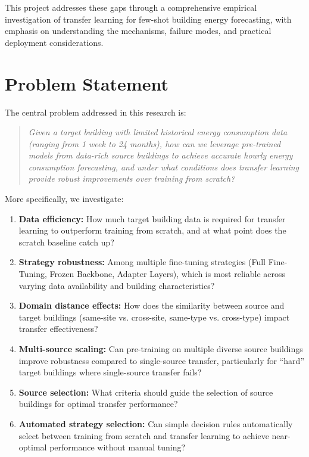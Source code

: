 \documentclass[12pt,a4paper]{report}
\begin{document}
This project addresses these gaps through a comprehensive empirical investigation of transfer learning for few-shot building energy forecasting, with emphasis on understanding the mechanisms, failure modes, and practical deployment considerations.

\section{Problem Statement}

The central problem addressed in this research is:

\begin{quote}
\textit{Given a target building with limited historical energy consumption data (ranging from 1 week to 24 months), how can we leverage pre-trained models from data-rich source buildings to achieve accurate hourly energy consumption forecasting, and under what conditions does transfer learning provide robust improvements over training from scratch?}
\end{quote}

More specifically, we investigate:

\begin{enumerate}
    \item \textbf{Data efficiency:} How much target building data is required for transfer learning to outperform training from scratch, and at what point does the scratch baseline catch up?
    
    \item \textbf{Strategy robustness:} Among multiple fine-tuning strategies (Full Fine-Tuning, Frozen Backbone, Adapter Layers), which is most reliable across varying data availability and building characteristics?
    
    \item \textbf{Domain distance effects:} How does the similarity between source and target buildings (same-site vs. cross-site, same-type vs. cross-type) impact transfer effectiveness?
    
    \item \textbf{Multi-source scaling:} Can pre-training on multiple diverse source buildings improve robustness compared to single-source transfer, particularly for ``hard'' target buildings where single-source transfer fails?
    
    \item \textbf{Source selection:} What criteria should guide the selection of source buildings for optimal transfer performance?
    
    \item \textbf{Automated strategy selection:} Can simple decision rules automatically select between training from scratch and transfer learning to achieve near-optimal performance without manual tuning?
\end{enumerate}
\end{document}
